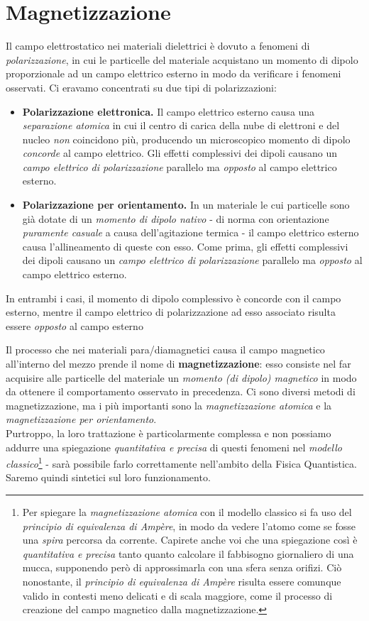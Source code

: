 \section{Magnetizzazione}
\begin{remember}
	Il campo elettrostatico nei materiali dielettrici è dovuto a fenomeni di \textit{polarizzazione}, in cui le particelle del materiale acquistano un momento di dipolo proporzionale ad un campo elettrico esterno in modo da verificare i fenomeni osservati. Ci eravamo concentrati su due tipi di polarizzazioni:
	\begin{itemize}
		\item \textbf{Polarizzazione elettronica.} Il campo elettrico esterno causa una \textit{separazione atomica} in cui il centro di carica della nube di elettroni e del nucleo \textit{non} coincidono più, producendo un microscopico momento di dipolo \textit{concorde} al campo elettrico. Gli effetti complessivi dei dipoli causano un \textit{campo elettrico di polarizzazione} parallelo ma \textit{opposto} al campo elettrico esterno.
		\item \textbf{Polarizzazione per orientamento.} In un materiale le cui particelle sono già dotate di un \textit{momento di dipolo nativo} - di norma con orientazione \textit{puramente casuale} a causa dell'agitazione termica - il campo elettrico esterno causa l'allineamento di queste con esso. Come prima, gli effetti complessivi dei dipoli causano un \textit{campo elettrico di polarizzazione} parallelo ma \textit{opposto} al campo elettrico esterno.
	\end{itemize}
In entrambi i casi, il momento di dipolo complessivo è concorde con il campo esterno, mentre il campo elettrico di polarizzazione ad esso associato risulta essere \textit{opposto} al campo esterno
\end{remember}
Il processo che nei materiali para/diamagnetici causa il campo magnetico all'interno del mezzo prende il nome di \textbf{magnetizzazione}: esso consiste nel far acquisire alle particelle del materiale un \textit{momento (di dipolo) magnetico} in modo da ottenere il comportamento osservato in precedenza. Ci sono diversi metodi di magnetizzazione, ma i più importanti sono la \textit{magnetizzazione atomica} e la \textit{magnetizzazione per orientamento}.\\
Purtroppo, la loro trattazione è particolarmente complessa e non possiamo addurre una spiegazione \textit{quantitativa e precisa} di questi fenomeni nel \textit{modello classico}\footnote{Per spiegare la \textit{magnetizzazione atomica} con il modello classico si fa uso del \textit{principio di equivalenza di Ampère}, in modo da vedere l'atomo come se fosse una \textit{spira} percorsa da corrente. Capirete anche voi che una spiegazione così è \textit{quantitativa e precisa} tanto quanto calcolare il fabbisogno giornaliero di una mucca, supponendo però di approssimarla con una sfera senza orifizi. Ciò nonostante, il \textit{principio di equivalenza di Ampère} risulta essere comunque valido in contesti meno delicati e di scala maggiore, come il processo di creazione del campo magnetico dalla magnetizzazione.} - sarà possibile farlo correttamente nell'ambito della Fisica Quantistica. Saremo quindi sintetici sul loro funzionamento.
